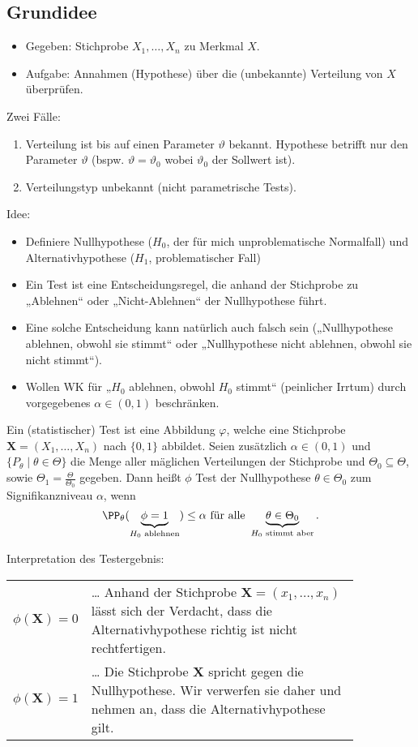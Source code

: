 \documentclass{scrreprt}
\renewenvironment{anumerate}{\begin{enumerate}[label=(\alph*)]}{\end{enumerate}} %
\begin{document}
\subsection{Grundidee}
\begin{itemize}
\item Gegeben: Stichprobe $X_1, \ldots, X_n$ zu Merkmal $X$.
\item Aufgabe: Annahmen (Hypothese) über die (unbekannte) Verteilung von $X$ überprüfen.
\end{itemize}
Zwei Fälle:
\begin{anumerate}
\item Verteilung ist bis auf einen Parameter $\vartheta$ bekannt. Hypothese betrifft nur den Parameter $\vartheta$ (bspw. $\vartheta = \vartheta _0$ wobei $\vartheta_0$ der Sollwert ist).
\item Verteilungstyp unbekannt (nicht parametrische Tests).
\end{anumerate}
Idee:
\begin{itemize}
\item Definiere Nullhypothese ($H_0$, der für mich unproblematische Normalfall) und Alternativhypothese ($H_1$, problematischer Fall)
\item Ein Test ist eine Entscheidungsregel, die anhand der Stichprobe zu „Ablehnen“ oder „Nicht-Ablehnen“ der Nullhypothese führt.
\item Eine solche Entscheidung kann natürlich auch falsch sein („Nullhypothese ablehnen, obwohl sie stimmt“ oder „Nullhypothese nicht ablehnen, obwohl sie nicht stimmt“).
\item Wollen WK für „$H_0$ ablehnen, obwohl $H_0$ stimmt“ (peinlicher Irrtum) durch vorgegebenes $\alpha \in (0,1)$ beschränken.
\end{itemize}

 Ein (statistischer) Test ist eine Abbildung $\varphi$, welche eine Stichprobe $\mathbf{X}=(X_1, \ldots, X_n)$ nach $\{0,1\}$ abbildet. Seien zusätzlich $\alpha \in (0,1)$ und $\{P_\theta \;|\; \theta \in \Theta\}$ die Menge aller mäglichen Verteilungen der Stichprobe und $\Theta_0 \subseteq \Theta$, sowie $\Theta_1 = \frac{\Theta}{\Theta_0}$ gegeben. Dann heißt $\phi$ Test der Nullhypothese $\theta \in \Theta_0$ zum Signifikanzniveau $\alpha$, wenn
$$\PP_\theta (\underbrace{\phi = 1}_{H_0\text{ ablehnen}}) \leq \alpha \text{ für alle } \underbrace{\theta \in \Theta_0}_{H_0 \text{ stimmt aber}}\text{.}$$

 Interpretation des Testergebnis:\\
\begin{tabular}{l p{0.85\linewidth}}
$\phi (\mathbf{X}) = 0$ & … Anhand der Stichprobe $\mathbf{X}=(x_1, \ldots, x_n)$ lässt sich der Verdacht, dass die Alternativhypothese richtig ist nicht rechtfertigen.\\
$\phi (\mathbf{X}) = 1$ & … Die Stichprobe $\mathbf{X}$ spricht gegen die Nullhypothese. Wir verwerfen sie daher und nehmen an, dass die Alternativhypothese gilt.
\end{tabular}
\end{document}
